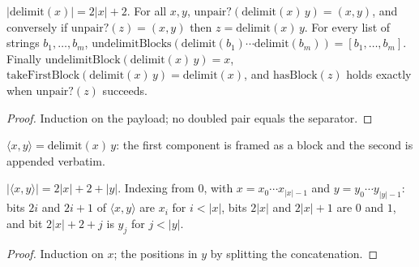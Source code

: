 \begin{lemma}
  \label{lem:encodings-delimit}
  \leanok
  $|\mathrm{delimit}(x)| = 2|x| + 2$. For all $x, y$,
  $\mathrm{unpair?}(\mathrm{delimit}(x)\, y) = (x, y)$, and conversely if
  $\mathrm{unpair?}(z) = (x, y)$ then $z = \mathrm{delimit}(x)\, y$. For every
  list of strings $b_1, \dots, b_m$,
  $\mathrm{undelimitBlocks}(\mathrm{delimit}(b_1) \cdots \mathrm{delimit}(b_m))
  = [b_1, \dots, b_m]$. Finally
  $\mathrm{undelimitBlock}(\mathrm{delimit}(x)\, y) = x$,
  $\mathrm{takeFirstBlock}(\mathrm{delimit}(x)\, y) = \mathrm{delimit}(x)$, and
  $\mathrm{hasBlock}(z)$ holds exactly when $\mathrm{unpair?}(z)$ succeeds.
\end{lemma}
\begin{proof}
  \leanok
  Induction on the payload; no doubled pair equals the separator.
\end{proof}

\begin{definition}
  \label{def:pair}
  \leanok
  $\langle x, y \rangle = \mathrm{delimit}(x)\, y$: the first component is
  framed as a block and the second is appended verbatim.
\end{definition}

\begin{lemma}
  \label{lem:encodings-pair-length}
  \leanok
  $|\langle x, y \rangle| = 2|x| + 2 + |y|$. Indexing from $0$, with
  $x = x_0 \cdots x_{|x|-1}$ and $y = y_0 \cdots y_{|y|-1}$: bits $2i$ and
  $2i + 1$ of $\langle x, y \rangle$ are $x_i$ for $i < |x|$, bits $2|x|$ and
  $2|x| + 1$ are $0$ and $1$, and bit $2|x| + 2 + j$ is $y_j$ for $j < |y|$.
\end{lemma}
\begin{proof}
  \leanok
  Induction on $x$; the positions in $y$ by splitting the concatenation.
\end{proof}

